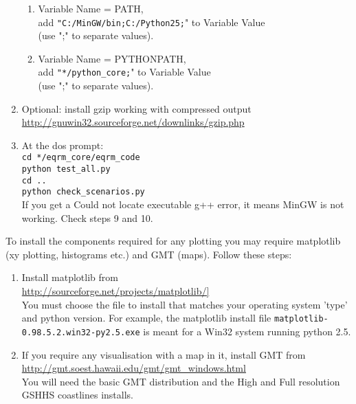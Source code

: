 \documentclass[a4paper, 12pt]{article}
\begin{document}
\begin{enumerate}
\begin{enumerate}
\item Variable Name = PATH, \\
add \texttt{"C:/MinGW/bin;C:/Python25;}" to  Variable Value \\
(use ";" to separate values).

\item Variable Name = PYTHONPATH, \\
add \texttt{"*/python\_core;}" to Variable Value \\
(use ";" to separate values).
\end{enumerate}

\item Optional: install gzip working with compressed output \\
\url{http://gnuwin32.sourceforge.net/downlinks/gzip.php}
\item At the dos prompt: \\
\texttt{cd */eqrm\_core/eqrm\_code} \\
\texttt{python test\_all.py} \\
\texttt{cd ..} \\
\texttt{python check\_scenarios.py} \\
If you get a Could not locate executable g++ error, it means MinGW
is not working.  Check steps 9 and 10.
\end{enumerate}
%
To install the components required for any plotting you may require
matplotlib (xy plotting, histograms etc.) and GMT (maps). Follow
these steps:

\begin{enumerate}
\item Install matplotlib from \\
\url{http://sourceforge.net/projects/matplotlib/]} \\
You must choose the file to install that matches your operating
system 'type' and python version. For example, the matplotlib
install file \texttt{matplotlib-0.98.5.2.win32-py2.5.exe} is meant
for a Win32 system running python 2.5.

\item If you require any visualisation with a map in it, install GMT
from \\
\url{http://gmt.soest.hawaii.edu/gmt/gmt_windows.html} \\
You will need the basic GMT distribution and the High and Full
resolution GSHHS coastlines installs.

\end{enumerate}
\end{document}
